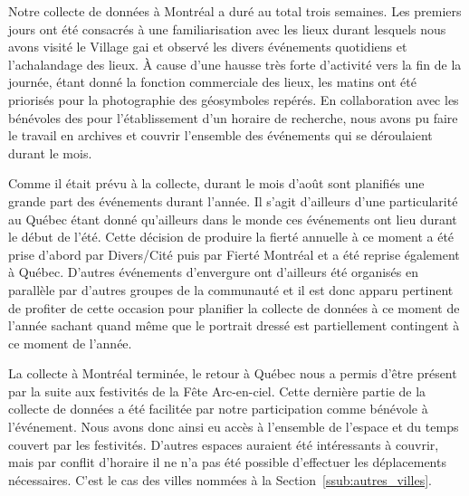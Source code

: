 Notre collecte de données à Montréal a duré au total trois semaines. 
Les premiers jours ont été consacrés à une familiarisation avec les lieux durant lesquels nous avons visité le Village gai et observé les divers événements quotidiens et l'achalandage des lieux. 
À cause d'une hausse très forte d'activité vers la fin de la journée, étant donné la fonction commerciale des lieux, les matins ont été priorisés pour la photographie des géosymboles repérés. 
En collaboration avec les bénévoles des \agq{} pour l'établissement d'un horaire de recherche, nous avons pu faire le travail en archives et couvrir l'ensemble des événements \lgbt{} qui se déroulaient durant le mois. 

Comme il était prévu à la collecte, durant le mois d'août sont planifiés une grande part des événements \lgbt{} durant l'année. 
Il s'agit d'ailleurs d'une particularité au Québec étant donné qu'ailleurs dans le monde ces événements ont lieu durant le début de l'été. 
Cette décision de produire la fierté annuelle à ce moment a été prise d'abord par Divers/Cité puis par Fierté Montréal et a été reprise également à Québec. 
D'autres événements d'envergure ont d'ailleurs été organisés en parallèle par d'autres groupes de la communauté et il est donc apparu pertinent de profiter de cette occasion pour planifier la collecte de données à ce moment de l'année sachant quand même que le portrait dressé est partiellement contingent à ce moment de l'année. 

La collecte à Montréal terminée, le retour à Québec nous a permis d'être présent par la suite aux festivités de la Fête Arc-en-ciel. 
Cette dernière partie de la collecte de données a été facilitée par notre participation comme bénévole à l'événement. 
Nous avons donc ainsi eu accès à l'ensemble de l'espace et du temps couvert par les festivités. 
D'autres espaces auraient été intéressants à couvrir, mais par conflit d'horaire il ne n'a pas été possible d'effectuer les déplacements nécessaires. 
C'est le cas des villes nommées à la Section~\ref{ssub:autres_villes}.


